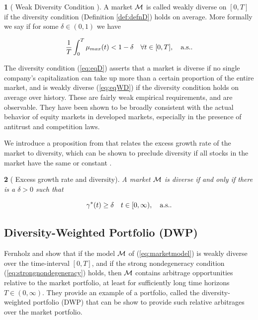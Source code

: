 \documentclass[british]{amsart} \usepackage{lmodern}
\numberwithin{equation}{section} \numberwithin{figure}{section}
\theoremstyle{plain} \newtheorem{thm}{\protect\theoremname}[section]
\theoremstyle{definition} \newtheorem{defn}[thm]{\protect\definitionname}
\theoremstyle{plain} \newtheorem{assumption}[thm]{\protect\assumptionname}
\theoremstyle{plain} \newtheorem{lem}[thm]{\protect\lemmaname}
\theoremstyle{plain} \newtheorem{prop}[thm]{\protect\propositionname}
\theoremstyle{remark} \newtheorem{rem}[thm]{\protect\remarkname}
\theoremstyle{plain} \newtheorem{cor}[thm]{\protect\corollaryname}
\begin{document}
\begin{defn}
  [
    {\cite[Equation 5.2]{fernholz2009}}
    Weak Diversity Condition
  ]
  A market $\mathcal{M}$ is called weakly diverse on $[0,T]$ if the diversity
  condition (Definition \ref{def:defnD}) holds on average. More formally 
  we say if for some $\delta\in(0,1)$ we have

  \begin{equation}
    \label{eq:eqWD}
      \frac{1}{T}\int_{0}^{T}\mu_{max}(t) < 1-\delta
      \quad \forall t\in[0,T],
      \quad \text{a.s.}.
  \end{equation}
\end{defn}

The diversity condition (\ref{eq:eqD}) asserts that a market is diverse if no
single company's capitalization can take up more than a certain proportion of
the entire market, and is weakly diverse (\ref{eq:eqWD}) if the diversity
condition holds on average over history. These are fairly weak empirical
requirements, and are observable. They have been shown to be broadly consistent
 with the actual behavior of equity markets in developed markets, especially 
in the presence of antitrust and competition laws.

We introduce a proposition from \cite{fernholz1999diversity} that relates the
excess growth rate of the market to diversity, which can be shown to preclude
diversity if all stocks in the market have the same {\cite[Corollary
3.1]{fernholz1999diversity}} or constant {\cite[Corollary
3.2]{fernholz1999diversity}}.

\begin{prop}
[
  {\cite[Proposition 3.1]{fernholz1999diversity}}
  Excess growth rate and diversity
]
  A market $\mathcal{M}$ is diverse if and only if there is a $\delta > 0$ such that

  \begin{equation}
      \gamma^{*}(t) \ge \delta
      \quad t\in[0,\infty),
      \quad \text{a.s.}.
  \end{equation}

\end{prop}

\subsection{Diversity-Weighted Portfolio (DWP)}

Fernholz \cite{fernholz1999diversity} and \cite{fernholz2009} show that if the
model $\mathcal{M}$ of (\ref{eq:marketmodel}) is weakly diverse over the
time-interval $[0,T]$, and if the strong nondegeneracy condition
(\ref{eq:strongnondegeneracy}) holds, then $\mathcal{M}$ contains arbitrage
opportunities relative to the market portfolio, at least for sufficiently long
time horizons $T \in (0,\infty)$. They provide an example of a portfolio, called
the diversity-weighted portfolio (DWP) that can be show to provide such relative
arbitrages over the market portfolio.
\end{document}
